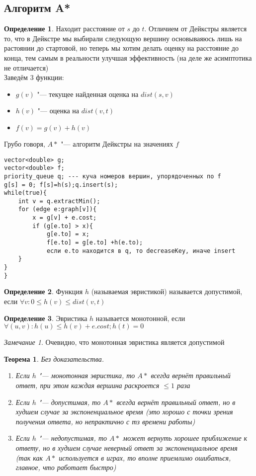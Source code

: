 \documentclass[a4paper, 12pt]{article}
\theoremstyle{plain}
\newtheorem{theorem}{Теорема}
\theoremstyle{definition}
\newtheorem{definition}{Определение}
\theoremstyle{remark}
\newtheorem*{remark}{Замечание}
\begin{document}
\subsection{Алгоритм A*}
\begin{definition}
	Находит расстояние от $s$ до $t$. Отличием от Дейкстры является то, что в Дейкстре мы выбирали следующую вершину основываяюсь лишь на растоянии до стартовой, но теперь мы хотим делать оценку на расстояние до конца, тем самым в реальности улучшая эффективность (на деле же асимптотика не отличается)\\
	Заведём $3$ функции:
	\begin{itemize}
		\item $g(v)$ "--- текущее найденная оценка на $dist(s,v)$
		\item $h(v)$ "--- оценка на $dist(v, t)$
		\item $f(v)=g(v)+h(v)$
	\end{itemize}
Грубо говоря, $A*$ "--- алгоритм Дейкстры на значениях $f$
\end{definition}
\begin{verbatim}
vector<double> g;
vector<double> f;
priority_queue q; --- куча номеров вершин, упорядоченных по f
g[s] = 0; f[s]=h(s);q.insert(s);
while(true){
    int v = q.extractMin();
    for (edge e:graph[v]){
        x = g[v] + e.cost;
        if (g[e.to] > x){
            g[e.to] = x;
            f[e.to] = g[e.to] +h(e.to);
            если e.to находится в q, то decreaseKey, иначе insert
    }
}
}
\end{verbatim}
\begin{definition}
	Функция $h$ (называемая эвристикой) называется допустимой, если $\forall v: 0\leq h(v)\leq dist(v, t)$
\end{definition}
\begin{definition}
	Эвристика $h$ называется монотонной, если $\forall (u,v): h(u)\leq h(v) + e.cost; h(t)=0$
\end{definition}
\begin{remark}
	Очевидно, что монотонная эвристика является допустимой
\end{remark}
\begin{theorem}
	Без доказательства. 
	\begin{enumerate}
		\item Если $h$ "--- монотонная эвристика, то $A*$ всегда вернёт правильный ответ, при этом каждая вершина раскроется $\leq1$ раза
		\item Если $h$ "--- допустимая, то $A*$ всегда вернёт правильный ответ, но в худшем случае за экспоненциальное время (это хорошо с точки зрения получения ответа, но непрактично с тз времени работы)
		\item Если $h$ "--- недопустимая, то $A*$ может вернуть хорошее приближение к ответу, но в худшем случае неверный ответ за экспоненциальное время (так как $A*$ используется в играх, то вполне приемлимо ошибаться, главное, что работает быстро)
	\end{enumerate}
\end{theorem}
\end{document}
